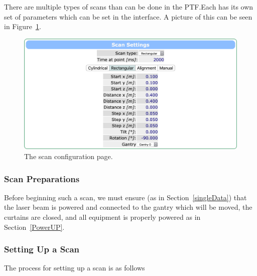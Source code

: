 \documentclass[twoside,letterpaper]{refart}
\begin{document}
There are multiple types of scans than can be done in the PTF.\@ Each has its own set of parameters which can be set in the interface. A picture of this can be seen in Figure~\ref{fig:scanParams}.

\FloatBarrier
\begin{figure}\centering
	\includegraphics[width=\textwidth]{scanParams.png}
	\caption{The scan configuration page.\label{fig:scanParams}}
\end{figure}
\FloatBarrier


\subsubsection{Scan Preparations}

Before beginning such a scan, we must ensure (as in Section~\ref{singleData}) that the laser beam is powered and connected to the gantry which will be moved, the curtains are closed, and all equipment is properly powered as in Section~\ref{PowerUP}.


\subsubsection{Setting Up a Scan}

The process for setting up a scan is as follows
\end{document}
